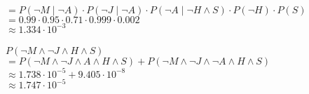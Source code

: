 \documentclass {article}
\begin{document}
	\indent $
		= P(\neg M \mid \neg A)
		\cdot P(\neg J \mid \neg A)
		\cdot P(\neg A \mid \neg H \land S)
		\cdot P(\neg H)
		\cdot P(S)
		$\\
	\indent $
		= 0.99
		\cdot 0.95
		\cdot 0.71
		\cdot 0.999
		\cdot 0.002
	$\\
	\indent $
		\approx 1.334 \cdot 10^{-3}
	$\\
\\
$P(\neg M \land \neg J \land H \land S)$\\
	\indent $
		= P(\neg M \land \neg J \land A \land H \land S)
		+ P(\neg M \land \neg J \land \neg A\land H \land S)
		$\\
	\indent $
		\approx 1.738 \cdot 10^{-5}
		+ 9.405 \cdot 10^{-8}
		$\\
	\indent $\approx 1.747 \cdot 10^{-5}$
\end{document}
